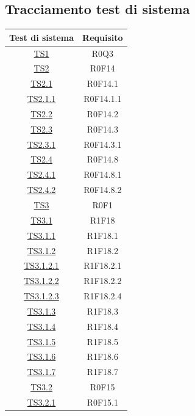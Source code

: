 \documentclass[../PianoDiQualifica.tex]{subfiles}
\begin{document}
\subsection{Tracciamento test di sistema}
	\normalsize
	\begin{longtable}{|c|c|}
		\hline
		\textbf{Test di sistema} & \textbf{Requisito}\\
		\hline
		\endhead
		\hyperlink{TS1}{TS1} & R0Q3  \\
		\hline
		\hyperlink{TS2}{TS2} & R0F14  \\
		\hline
		\hyperlink{TS2.1}{TS2.1} & R0F14.1   \\
		\hline
		\hyperlink{TS2.1.1}{TS2.1.1} & R0F14.1.1   \\
		\hline
		\hyperlink{TS2.2}{TS2.2} & R0F14.2   \\
		\hline
		\hyperlink{TS2.3}{TS2.3} & R0F14.3   \\
		\hline
		\hyperlink{TS2.3.1}{TS2.3.1} & R0F14.3.1   \\
		\hline
		\hyperlink{TS2.4}{TS2.4} & R0F14.8   \\
		\hline
		\hyperlink{TS2.4.1}{TS2.4.1} & R0F14.8.1   \\
		\hline
		\hyperlink{TS2.4.2}{TS2.4.2} & R0F14.8.2   \\
		\hline
		\hyperlink{TS3}{TS3} & R0F1   \\
		\hline
		\hyperlink{TS3.1}{TS3.1} & R1F18   \\
		\hline
		\hyperlink{TS3.1.1}{TS3.1.1} & R1F18.1   \\
		\hline
		\hyperlink{TS3.1.2}{TS3.1.2} & R1F18.2   \\
		\hline
		\hyperlink{TS3.1.2.1}{TS3.1.2.1} & R1F18.2.1   \\
		\hline
		\hyperlink{TS3.1.2.2}{TS3.1.2.2} & R1F18.2.2   \\
		\hline
		\hyperlink{TS3.1.2.3}{TS3.1.2.3} & R1F18.2.4   \\
		\hline
		\hyperlink{TS3.1.3}{TS3.1.3} & R1F18.3   \\
		\hline
		\hyperlink{TS3.1.4}{TS3.1.4} & R1F18.4   \\
		\hline
		\hyperlink{TS3.1.5}{TS3.1.5} & R1F18.5   \\
		\hline
		\hyperlink{TS3.1.6}{TS3.1.6} & R1F18.6   \\
		\hline
		\hyperlink{TS3.1.7}{TS3.1.7} & R1F18.7   \\
		\hline
		\hyperlink{TS3.2}{TS3.2} & R0F15   \\
		\hline
		\hyperlink{TS3.2.1}{TS3.2.1} & R0F15.1   \\

\end{longtable}
\end{document}
